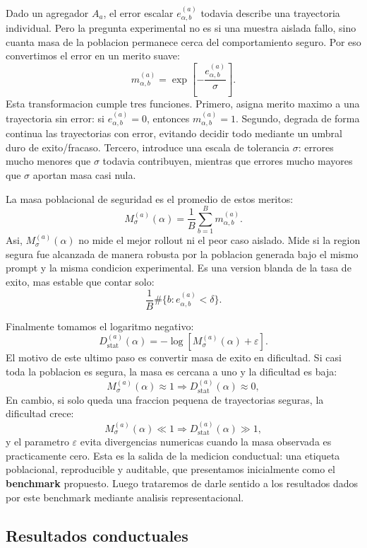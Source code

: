 ﻿\documentclass[10pt,twocolumn]{article}
\newcommand{\Mmass}{M_{\sigma}}
\begin{document}
Dado un agregador \(A_a\), el error escalar \(e^{(a)}_{\alpha,b}\) todavia describe una trayectoria individual. Pero la pregunta experimental no es si una muestra aislada fallo, sino cuanta masa de la poblacion permanece cerca del comportamiento seguro. Por eso convertimos el error en un merito suave:
\[
m^{(a)}_{\alpha,b}
=
\exp\left[
-\frac{e^{(a)}_{\alpha,b}}{\sigma}
\right].
\]
Esta transformacion cumple tres funciones. Primero, asigna merito maximo a una trayectoria sin error: si \(e^{(a)}_{\alpha,b}=0\), entonces \(m^{(a)}_{\alpha,b}=1\). Segundo, degrada de forma continua las trayectorias con error, evitando decidir todo mediante un umbral duro de exito/fracaso. Tercero, introduce una escala de tolerancia \(\sigma\): errores mucho menores que \(\sigma\) todavia contribuyen, mientras que errores mucho mayores que \(\sigma\) aportan masa casi nula.

La masa poblacional de seguridad es el promedio de estos meritos:
\[
\Mmass^{(a)}(\alpha)
=
\frac{1}{B}
\sum_{b=1}^{B}
m^{(a)}_{\alpha,b}.
\]
Asi, \(\Mmass^{(a)}(\alpha)\) no mide el mejor rollout ni el peor caso aislado. Mide si la region segura fue alcanzada de manera robusta por la poblacion generada bajo el mismo prompt y la misma condicion experimental. Es una version blanda de la tasa de exito, mas estable que contar solo:
\[
\frac{1}{B}
\#\{b:e^{(a)}_{\alpha,b}<\delta\}.
\]

Finalmente tomamos el logaritmo negativo:
\[
D^{(a)}_{\mathrm{stat}}(\alpha)
=
-\log\left[
\Mmass^{(a)}(\alpha)+\varepsilon
\right].
\]
El motivo de este ultimo paso es convertir masa de exito en dificultad. Si casi toda la poblacion es segura, la masa es cercana a uno y la dificultad es baja:
\[
\Mmass^{(a)}(\alpha)\approx 1
\Rightarrow
D^{(a)}_{\mathrm{stat}}(\alpha)\approx 0,
\]
En cambio, si solo queda una fraccion pequena de trayectorias seguras, la dificultad crece:
\[
\Mmass^{(a)}(\alpha)\ll 1
\Rightarrow
D^{(a)}_{\mathrm{stat}}(\alpha)\gg 1,
\]
y el parametro \(\varepsilon\) evita divergencias numericas cuando la masa observada es practicamente cero. Esta es la salida de la medicion conductual: una etiqueta poblacional, reproducible y auditable, que presentamos inicialmente como el \textbf{benchmark} propuesto. Luego trataremos de darle sentido a los resultados dados por este benchmark mediante analisis representacional.

\subsection{Resultados conductuales}
\end{document}
